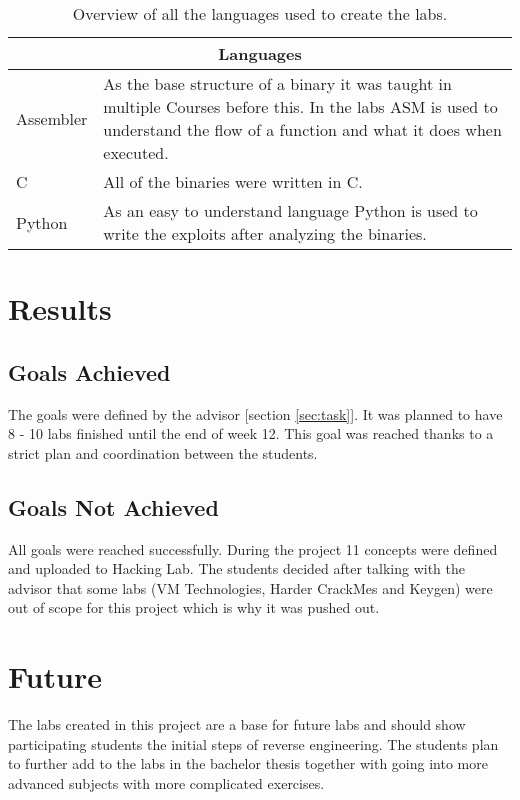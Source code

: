 \begin{center}
    \begin{table}[H]
        \centering
        \begin{tabular}{ |p{4.1cm}|p{10cm}| } 
            \hline
            \multicolumn{2}{||c||}{\textbf{Languages}} \\
            \hline
            \hline
                Assembler & As the base structure of a binary it was taught in multiple Courses before this. In the labs ASM is used to understand the flow of a function and what it does when executed. \\
            \hline
                C & All of the binaries were written in C.   \\
            \hline
                Python & As an easy to understand language Python is used to write the exploits after analyzing the binaries. \\
            \hline
        \end{tabular}
        \caption{Overview of all the languages used to create the labs.}
        \label{tab:languages}
    \end{table}
\end{center}

\section{Results}
\subsection{Goals Achieved}
The goals were defined by the advisor [section \ref{sec:task}]. It was planned to have 8 - 10 labs finished until the end of week 12. This goal was reached thanks to a strict plan and coordination between the students.

\subsection{Goals Not Achieved}
All goals were reached successfully. During the project 11 concepts were defined and uploaded to Hacking Lab. The students decided after talking with the advisor that some labs (VM Technologies, Harder CrackMes and Keygen) were out of scope for this project which is why it was pushed out. 

\section{Future}
The labs created in this project are a base for future labs and should show participating students the initial steps of reverse engineering. The students plan to further add to the labs in the bachelor thesis together with going into more advanced subjects with more complicated exercises. 
